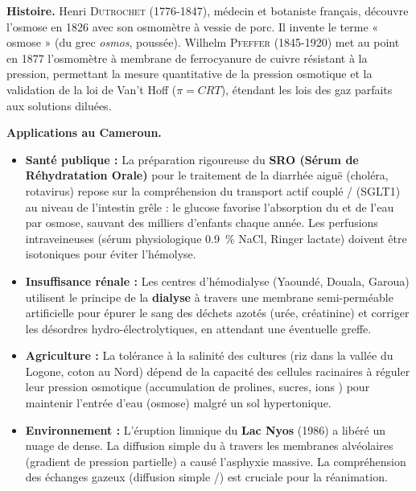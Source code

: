 \documentclass[11pt]{article}
\begin{document}
\begin{savaistu}
\textbf{Histoire.} Henri \textsc{Dutrochet} (1776-1847), médecin et botaniste français, découvre l'osmose en 1826 avec son osmomètre à vessie de porc. Il invente le terme « osmose » (du grec \emph{osmos}, poussée). Wilhelm \textsc{Pfeffer} (1845-1920) met au point en 1877 l'osmomètre à membrane de ferrocyanure de cuivre résistant à la pression, permettant la mesure quantitative de la pression osmotique et la validation de la loi de Van't Hoff ($\pi = CRT$), étendant les lois des gaz parfaits aux solutions diluées.

\textbf{Applications au Cameroun.}
\begin{itemize}
\item \textbf{Santé publique :} La préparation rigoureuse du \textbf{SRO (Sérum de Réhydratation Orale)} pour le traitement de la diarrhée aiguë (choléra, rotavirus) repose sur la compréhension du transport actif couplé / (SGLT1) au niveau de l'intestin grêle : le glucose favorise l'absorption du  et de l'eau par osmose, sauvant des milliers d'enfants chaque année. Les perfusions intraveineuses (sérum physiologique \SI{0,9}{\%} NaCl, Ringer lactate) doivent être isotoniques pour éviter l'hémolyse.
\item \textbf{Insuffisance rénale :} Les centres d'hémodialyse (Yaoundé, Douala, Garoua) utilisent le principe de la \textbf{dialyse} à travers une membrane semi-perméable artificielle pour épurer le sang des déchets azotés (urée, créatinine) et corriger les désordres hydro-électrolytiques, en attendant une éventuelle greffe.
\item \textbf{Agriculture :} La tolérance à la salinité des cultures (riz dans la vallée du Logone, coton au Nord) dépend de la capacité des cellules racinaires à réguler leur pression osmotique (accumulation de prolines, sucres, ions ) pour maintenir l'entrée d'eau (osmose) malgré un sol hypertonique.
\item \textbf{Environnement :} L'éruption limnique du \textbf{Lac Nyos} (1986) a libéré un nuage de  dense. La diffusion simple du  à travers les membranes alvéolaires (gradient de pression partielle) a causé l'asphyxie massive. La compréhension des échanges gazeux (diffusion simple /) est cruciale pour la réanimation.
\end{itemize}
\end{savaistu}

\newpage
\end{document}
